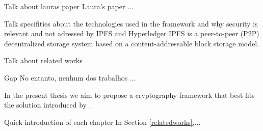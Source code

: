 \begin{draft}{Talk about lauras paper}
    Laura's paper ...
\end{draft}


\begin{draft}{Talk specifities about the technologies used in the framework and why security is relevant and not adressed by IPFS and Hyperledger}
    IPFS \cite{benet2013ipfs} is a peer-to-peer (P2P) decentralized storage system based on a content-addressable block storage model.
\end{draft}


\begin{draft}{Talk about related works}
    
\end{draft}

\begin{draft}{Gap}
    No entanto, nenhum dos trabalhos ...
\end{draft}


In the present thesis we aim to propose a cryptography framework that best fits the solution introduced by \citet{laura2023}.


\begin{draft}{Quick introduction of each chapter}
    In Section \ref{relatedworks},...

\end{draft}
